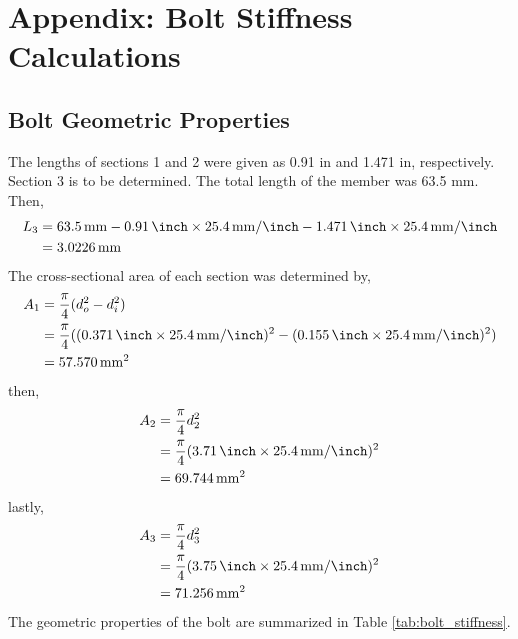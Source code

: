 
\section{Appendix: Bolt Stiffness Calculations}

\subsection{Bolt Geometric Properties}
The lengths of sections 1 and 2 were given as 0.91 in and 1.471 in, respectively. Section 3 is to be determined. The total length of the member was 63.5 mm. Then,
\begin{align*}
    L_3 &= \qty{63.5}{\milli\meter} - \qty{0.91}{\inch}\times \qty{25.4}{\milli\meter\per\inch} - \qty{1.471}{\inch}\times \qty{25.4}{\milli\meter\per\inch} \\
    &= \qty{3.0226}{\milli\meter}
\end{align*}
The cross-sectional area of each section was determined by,
\begin{align*}
    A_1 &= \frac{\pi}{4} (d_o^2 - d_i^2) \\
    &= \frac{\pi}{4} ((\qty{0.371}{\inch}\times \qty{25.4}{\milli\meter\per\inch})^2 - (\qty{0.155}{\inch}\times \qty{25.4}{\milli\meter\per\inch})^2) \\
    &= \qty{57.570}{\milli\meter\squared}
\end{align*}
then,
\begin{align*}
    A_2 &= \frac{\pi}{4} d_2^2 \\
    &= \frac{\pi}{4} (\qty{3.71}{\inch}\times \qty{25.4}{\milli\meter\per\inch})^2 \\
    &= \qty{69.744}{\milli\meter\squared}
\end{align*}
lastly,
\begin{align*}
    A_3 &= \frac{\pi}{4} d_3^2 \\
    &= \frac{\pi}{4} (\qty{3.75}{\inch}\times \qty{25.4}{\milli\meter\per\inch})^2 \\
    &= \qty{71.256}{\milli\meter\squared}
\end{align*}
The geometric properties of the bolt are summarized in Table \ref{tab:bolt_stiffness}.

